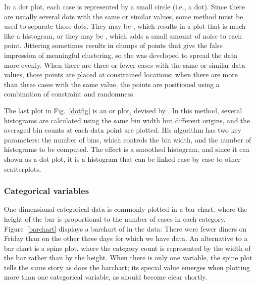 In a dot plot, each case is represented by a small circle (i.e., a dot).
Since there are usually several dots with the same or similar values,
some method must be used to separate those dots.  They may be
, which results in a plot that is much like a histogram, or
they may be , which adds a small amount of noise to each
point.  Jittering sometimes results in clumps of points that give the
false impression of meaningful clustering, so the  was developed \cite{TukeyTukey90} to spread the data more
evenly.  When there are three or fewer cases with the same or similar
data values, those points are placed at constrained locations; when
there are more than three cases with the same value, the points are
positioned using a combination of constraint and randomness.


The last plot in Fig.~\ref{dotfig} is an  or  plot, devised by .  In
this method, several histograms are calculated using the same bin
width but different origins, and the averaged bin counts at each data
point are plotted.  His algorithm has two key parameters: the number
of bins, which controls the bin width, and the number of histograms to
be computed.  The effect is a smoothed histogram, and since it can
shown as a dot plot, it is a histogram that can be linked case by case
to other scatterplots.

\subsubsection{Categorical variables}


One-dimensional categorical data is commonly plotted in a bar chart,
where the height of the bar is proportional to the number of cases in
each category.  Figure~\ref{barchart} displays a barchart of 
in the  data: There were fewer diners on Friday than on the
other three days for which we have data. An alternative to a bar chart
is a spine plot, where the category count is represented by the width
of the bar rather than by the height.  When there is only one
variable, the spine plot tells the same story as does the barchart;
its special value emerges when plotting more than one categorical
variable, as should become clear shortly.

